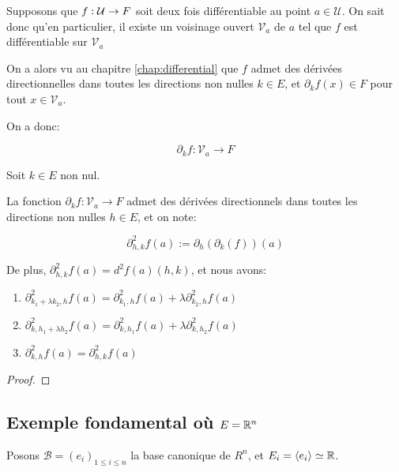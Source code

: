 Supposons que $f : \mathcal{U} \rightarrow F$ soit deux fois différentiable au
point $a \in \mathcal{U}$.
On sait donc qu'en particulier, il existe un voisinage ouvert $\mathcal{V}_{a}$ de $a$ tel
que $f$ est différentiable sur $\mathcal{V}_{a}$

On a alors vu au chapitre \ref{chap:differential} que $f$ admet des
dérivées directionnelles dans toutes les directions non nulles $k \in E$, et
$\partial_{k}{f} (x) \in F$ pour tout $x \in \mathcal{V}_{a}$.

On a donc:

\begin{equation}
	\partial_{k}f : \mathcal{V}_{a} \rightarrow F
\end{equation}

\begin{proposition}
	Soit $k \in E$ non nul.

	La fonction $\partial_{k}f : \mathcal{V}_{a} \rightarrow F$ admet des
	dérivées directionnels dans toutes les directions non nulles $h \in E$, et
	on note:

	\begin{equation}
		\partial_{h, k}^{2} f (a) := \partial_{h} (\partial_{k}(f)) (a)
	\end{equation}

	De plus, $\partial_{h, k}^{2} f (a) = d^{2}f(a) (h, k)$, et nous avons:

	\begin{enumerate}
		\item $\partial_{k_{1} + \lambda k_{2}, h}^{2} f(a) =
			\partial_{k_{1}, h}^{2}f(a) + \lambda \partial_{k_{2}, h}^{2} f(a)$
		\item $\partial_{k, h_{1} + \lambda h_{2}}^{2} f(a) = \partial_{k,
				h_{1}}^{2} f(a) + \lambda \partial_{k, h_{2}}^{2} f(a)$
		\item $\partial_{k, h}^{2} f(a) = \partial_{h, k}^{2} f(a)$
	\end{enumerate}
\end{proposition}

\ifdefined\outputproof
\begin{proof}

\end{proof}
\fi

\subsection{Exemple fondamental où $E = \mathbb{R}^{n}$}

Posons $\mathcal{B} = (e_{i})_{1 \leq i \leq n}$ la base canonique de $R^{n}$,
et $E_{i} = \left<e_{i}\right> \simeq \mathbb{R}$.

